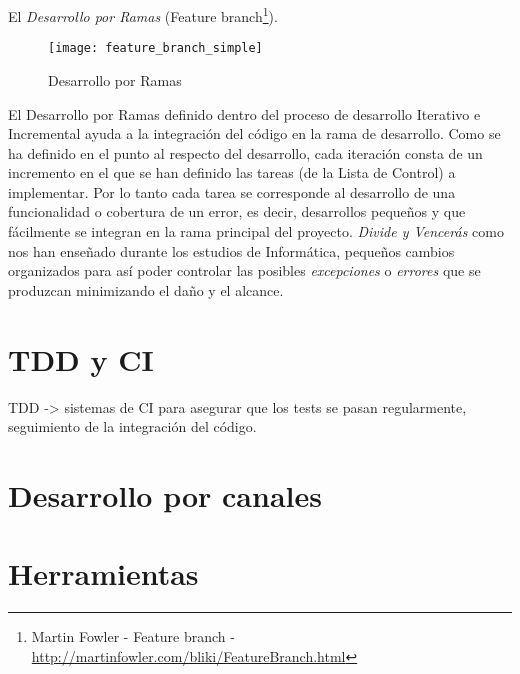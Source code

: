 \par El \emph{Desarrollo por Ramas} (Feature branch\footnote{Martin Fowler - Feature branch - \url{http://martinfowler.com/bliki/FeatureBranch.html}}).

\begin{figure}[H]
    \centering
    \texttt{[image: feature\_branch\_simple]}
    \caption{Desarrollo por Ramas}
    \label{fig:feature_branch_simple}
\end{figure}

\par El Desarrollo por Ramas definido dentro del proceso de desarrollo Iterativo e Incremental ayuda a la integración del código en la rama de desarrollo. Como se ha definido en el punto al respecto del desarrollo, cada iteración consta de un incremento en el que se han definido las tareas (de la Lista de Control) a implementar. Por lo tanto cada tarea se corresponde al desarrollo de una funcionalidad o cobertura de un error, es decir, desarrollos pequeños y que fácilmente se integran en la rama principal del proyecto. \emph{Divide y Vencerás} como nos han enseñado durante los estudios de Informática, pequeños cambios organizados para así poder controlar las posibles \emph{excepciones} o \emph{errores} que se produzcan minimizando el daño y el alcance.


\section{TDD y CI}
\label{sec:tdd-ci}

\par TDD -> sistemas de CI para asegurar que los tests se pasan regularmente, seguimiento de la integración del código.


\section{Desarrollo por canales}
\label{sec:desarrollo-canales}


\section{Herramientas}
\label{sec:herramientas}

